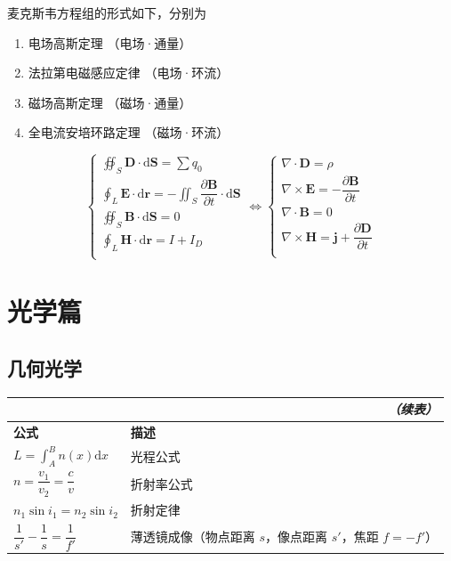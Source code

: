 \documentclass[UTF8]{ctexart}
\newcommand\Example[1]{\textcolor{cyan!70!black}{\small #1}}
\renewcommand\d{\mathrm{d}}
\newcommand\B{\boldsymbol{B}}
\renewcommand\S{\boldsymbol{S}}
\renewcommand\H{\boldsymbol{H}}
\begin{document}
麦克斯韦方程组的形式如下，分别为
\begin{enumerate}[itemsep=0pt,parsep=0pt]
    \item 电场高斯定理 （电场·通量）
    \item 法拉第电磁感应定律  （电场·环流）
    \item 磁场高斯定理 （磁场·通量）
    \item 全电流安培环路定理 （磁场·环流）
\end{enumerate}
\begin{equation*}
    \begin{cases}
        \displaystyle\oiint_S \boldsymbol{D}\cdot \d\S = \sum q_0 \\
        \displaystyle\oint_L \boldsymbol{E}\cdot\d\boldsymbol{r} = -\iint_S \dfrac{\partial \B}{\partial t}\cdot\d\S \\
        \displaystyle\oiint_S \B\cdot\d\S = 0 \\
        \displaystyle\oint_L \H\cdot\d\boldsymbol{r} = I + I_D \\
    \end{cases}
    \iff
    \begin{cases}
        \nabla\cdot\boldsymbol{D} = \rho \\
        \nabla\times\boldsymbol{E} = -\dfrac{\partial \B}{\partial t} \\
        \nabla\cdot\B = 0 \\
        \nabla\times\H = \boldsymbol{j} + \dfrac{\partial \boldsymbol{D}}{\partial t} \\
    \end{cases}
\end{equation*}

\section{光学篇}
\subsection{几何光学}
\begin{longtable}{|p{}|p{}|}
    \multicolumn{2}{r}{\textit{（续表）}} \\
    \hline
\endhead
    \hline
\endfirsthead
\endfoot
    \hline
\endlastfoot

    \textbf{公式} & \textbf{描述} \\
    \hline
    $\displaystyle L = \int_A^B n(x)\d x$ & 光程公式 \\
    \hline
    $n = \dfrac{v_1}{v_2} = \dfrac{c}{v}$ & 折射率公式 \\
    \hline
    $n_1\sin i_1 = n_2\sin i_2$ & 折射定律 \\
    \hline
    $\dfrac{1}{s'} - \dfrac{1}{s} = \dfrac{1}{f'}$ & 薄透镜成像\Example{（物点距离 $s$，像点距离 $s'$，焦距 $f=-f'$）} \\
    \hline
\end{longtable}
\end{document}
